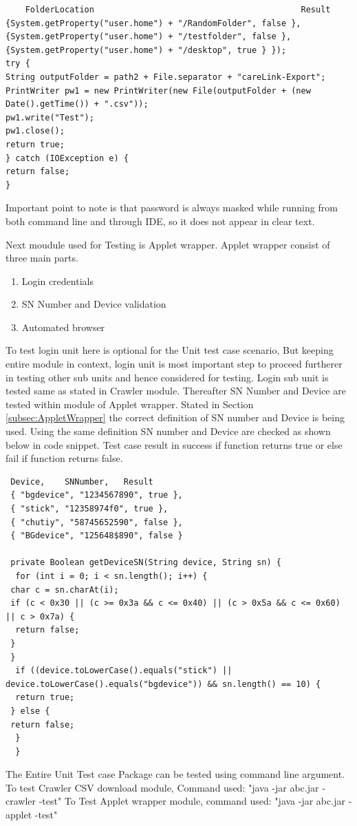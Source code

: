 \documentclass[article,type=msc,colorback,accentcolor=tud9c,twoside,11pt]{tudthesis}
\begin{document}
 \begin{lstlisting}
	FolderLocation											Result
{System.getProperty("user.home") + "/RandomFolder", false },
{System.getProperty("user.home") + "/testfolder", false },
{System.getProperty("user.home") + "/desktop", true } });
try {
String outputFolder = path2 + File.separator + "careLink-Export";
PrintWriter pw1 = new PrintWriter(new File(outputFolder + (new Date().getTime()) + ".csv"));
pw1.write("Test");
pw1.close();
return true;
} catch (IOException e) {
return false;
}
\end{lstlisting}
 Important point to note is that password is always masked while running from both command line and through IDE, so it does not appear in clear text.
 
 
Next moudule used for Testing is Applet wrapper. Applet wrapper consist of three main parts.
 \begin{enumerate}
\item Login credentials
\item SN Number and Device validation
\item Automated browser
\end{enumerate}
To test login unit here is optional for the Unit test case scenario, But keeping entire module in context, login unit is most important step to proceed furtherer in testing other sub units and hence considered for testing. Login sub unit is tested same as stated in Crawler module. Thereafter SN Number and Device are tested within module of Applet wrapper. Stated in Section \ref{subsec:AppletWrapper} the correct definition of SN number and Device is being used. Using the same definition SN number and Device are checked as shown below in code snippet. Test case result in success if function returns true or else fail if function returns false.

\begin{lstlisting}
 Device, 	SNNumber, 	Result
 { "bgdevice", "1234567890", true },
 { "stick", "12358974f0", true },
 { "chutiy", "58745652590", false },
 { "BGdevice", "125648$890", false }
 
 private Boolean getDeviceSN(String device, String sn) {
  for (int i = 0; i < sn.length(); i++) {
 char c = sn.charAt(i);
 if (c < 0x30 || (c >= 0x3a && c <= 0x40) || (c > 0x5a && c <= 0x60) || c > 0x7a) {
  return false;
 }
 }
  if ((device.toLowerCase().equals("stick") || device.toLowerCase().equals("bgdevice")) && sn.length() == 10) {
  return true;
 } else {
 return false;
  }
  }
\end{lstlisting}
The Entire Unit Test case Package can be tested using command line argument.
To test Crawler CSV download module, Command used:\newline
"java -jar abc.jar -crawler -test"\newline 
To Test Applet wrapper module, command used:\newline
"java -jar abc.jar - applet -test"
 
\end{document}
